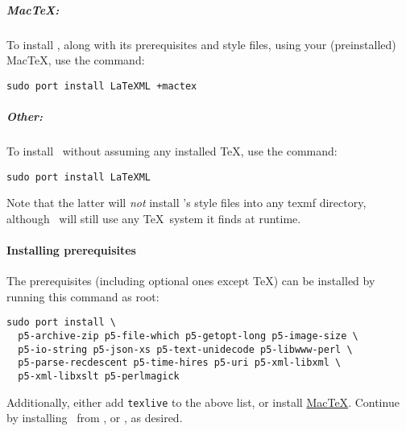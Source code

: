 \documentclass{article}
\begin{document}
\subparagraph{MacTeX:}  To install \LaTeXML, along with its prerequisites and style files,
using your (preinstalled) MacTeX, use the command:
\begin{lstlisting}[style=shell]
sudo port install LaTeXML +mactex
\end{lstlisting}

\subparagraph{Other:} To install \LaTeXML\ without assuming any installed \TeX,
use the command:
\begin{lstlisting}[style=shell]
sudo port install LaTeXML
\end{lstlisting}
Note that the latter will \emph{not} install \LaTeXML's style files into any texmf directory,
although \LaTeXML\ will still use any \TeX\ system it finds at runtime.

\paragraph{Installing prerequisites}\label{install.mac.prereq}
The prerequisites (including optional ones except \TeX) can be installed by running
this command as root: 
\begin{lstlisting}[style=shell]
sudo port install \
  p5-archive-zip p5-file-which p5-getopt-long p5-image-size \
  p5-io-string p5-json-xs p5-text-unidecode p5-libwww-perl \
  p5-parse-recdescent p5-time-hires p5-uri p5-xml-libxml \
  p5-xml-libxslt p5-perlmagick
\end{lstlisting}
Additionally, either add \texttt{texlive} to the above list,
or install \href{http://tug.org/mactex/}{MacTeX}.
Continue by installing \LaTeXML\ from
, 
or \htmlref{GitHub}{install.github}, as desired.

\end{document}
